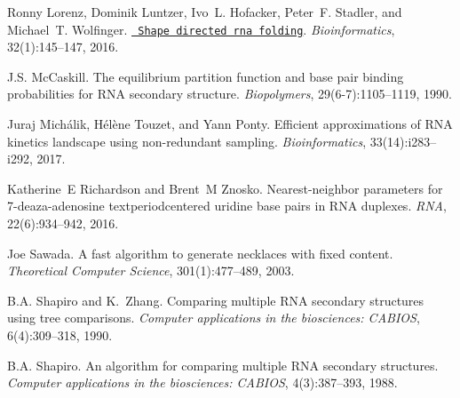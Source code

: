\begin{DoxyDescription}
\item[\label{citelist_CITEREF_lorenz:2016a}%
\Hypertarget{citelist_CITEREF_lorenz:2016a}%
\mbox{[}22\mbox{]}]Ronny Lorenz, Dominik Luntzer, Ivo~L. Hofacker, Peter~F. Stadler, and Michael~T. Wolfinger. \href{http://bioinformatics.oxfordjournals.org/content/32/1/145.abstract}{\texttt{ Shape directed rna folding}}. {\itshape Bioinformatics}, 32(1)\+:145--147, 2016. 


\item[\label{citelist_CITEREF_mccaskill:1990}%
\Hypertarget{citelist_CITEREF_mccaskill:1990}%
\mbox{[}23\mbox{]}]J.\+S. Mc\+Caskill. The equilibrium partition function and base pair binding probabilities for RNA secondary structure. {\itshape Biopolymers}, 29(6-\/7)\+:1105--1119, 1990.


\item[\label{citelist_CITEREF_michalik:2017}%
\Hypertarget{citelist_CITEREF_michalik:2017}%
\mbox{[}24\mbox{]}]Juraj Mich\'{a}lik, H\'{e}l\`{e}ne Touzet, and Yann Ponty. Efficient approximations of RNA kinetics landscape using non-\/redundant sampling. {\itshape Bioinformatics}, 33(14)\+:i283--i292, 2017.


\item[\label{citelist_CITEREF_richardson:2016}%
\Hypertarget{citelist_CITEREF_richardson:2016}%
\mbox{[}25\mbox{]}]Katherine~E Richardson and Brent~M Znosko. Nearest-\/neighbor parameters for 7-\/deaza-\/adenosine textperiodcentered uridine base pairs in RNA duplexes. {\itshape RNA}, 22(6)\+:934--942, 2016. 


\item[\label{citelist_CITEREF_sawada:2003}%
\Hypertarget{citelist_CITEREF_sawada:2003}%
\mbox{[}26\mbox{]}]Joe Sawada. A fast algorithm to generate necklaces with fixed content. {\itshape Theoretical Computer Science}, 301(1)\+:477--489, 2003.


\item[\label{citelist_CITEREF_shapiro:1990}%
\Hypertarget{citelist_CITEREF_shapiro:1990}%
\mbox{[}27\mbox{]}]B.\+A. Shapiro and K.~Zhang. Comparing multiple RNA secondary structures using tree comparisons. {\itshape Computer applications in the biosciences\+: CABIOS}, 6(4)\+:309--318, 1990.


\item[\label{citelist_CITEREF_shapiro:1988}%
\Hypertarget{citelist_CITEREF_shapiro:1988}%
\mbox{[}28\mbox{]}]B.\+A. Shapiro. An algorithm for comparing multiple RNA secondary structures. {\itshape Computer applications in the biosciences\+: CABIOS}, 4(3)\+:387--393, 1988.



\end{DoxyDescription}
